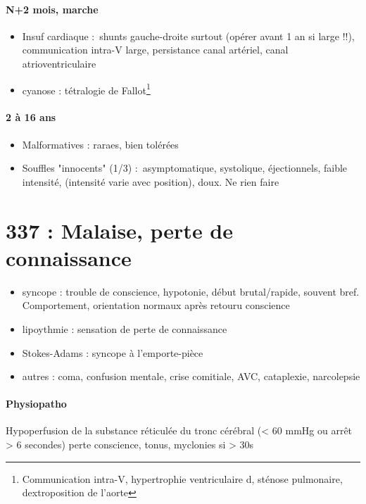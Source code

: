 \paragraph{N+2 mois, marche}
\begin{itemize}
  \item Insuf cardiaque : shunts gauche-droite surtout (\thus opérer avant 1 an
    si large !!), communication intra-V
    large, persistance canal artériel, canal atrioventriculaire
  \item cyanose : tétralogie de Fallot\footnote{Communication intra-V,
      hypertrophie ventriculaire d, sténose pulmonaire, dextroposition de
    l'aorte}
\end{itemize}
\paragraph{2 à 16 ans}
\begin{itemize}
  \item Malformatives : raraes, bien tolérées
  \item Souffles "innocents" (1/3) : asymptomatique, systolique, éjectionnels,
    faible intensité, (intensité varie avec position), doux. Ne rien faire
\end{itemize}




\section{337 : Malaise, perte de connaissance}%
\label{sec:337_malaise_perte_de_connaissance}
\begin{itemize}
  \item syncope : trouble de conscience, hypotonie, début brutal/rapide, souvent
    bref. Comportement, orientation normaux après retouru conscience
  \item lipoythmie : sensation de perte de connaissance
  \item Stokes-Adams : syncope à l'emporte-pièce
  \item autres : coma, confusion mentale, crise comitiale, AVC, cataplexie,
    narcolepsie
\end{itemize}

\paragraph{Physiopatho}
Hypoperfusion de la substance réticulée du tronc cérébral (< 60 mmHg ou arrêt >
6 secondes) \thus perte conscience, tonus, myclonies si > 30s

